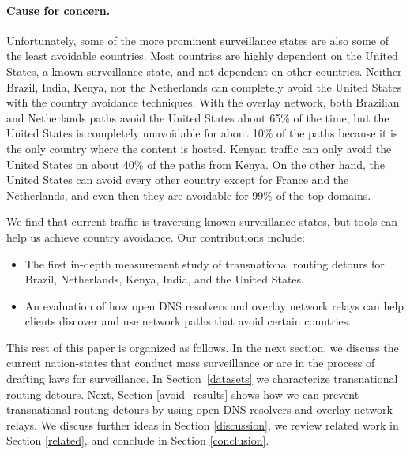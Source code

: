 \paragraph{Cause for concern.} Unfortunately, some of the more prominent surveillance states are also
some of the least avoidable countries.  Most countries are
highly dependent on the United States, a known surveillance state, and
not dependent on other countries.  Neither Brazil, India, Kenya, nor the
Netherlands can completely avoid the United States with the country
avoidance techniques.  With the overlay network, both Brazilian and
Netherlands paths avoid the United States about 65\% of the time, but
the United States is completely unavoidable for about 10\% of the paths
because it is the only country where the content is hosted.  Kenyan traffic can
only avoid the United States on about 40\% of the paths from Kenya.  On the other hand, the United States can avoid
every other country except for France and the Netherlands, and even then
they are avoidable for 99\% of the top domains. 

We find that current traffic is traversing known surveillance states, but tools can help us achieve country avoidance. Our contributions 
include: 

\begin{itemize}
\item The first in-depth measurement study of
  transnational routing detours for Brazil, Netherlands, Kenya, India, and the
  United States. 
\item An evaluation of how open DNS resolvers and overlay
  network relays can help clients discover and use
  network paths that avoid certain countries.
\end{itemize}
\noindent

This rest of this paper is organized as follows.  In the next section, we discuss
the current nation-states that conduct mass surveillance or are in the 
process of drafting laws for surveillance.  In
Section~\ref{datasets} we characterize transnational routing detours. Next, Section
\ref{avoid_results} shows how we can prevent transnational routing detours by using open DNS resolvers
and overlay network relays.  We discuss further ideas in Section
\ref{discussion}, we review related work in Section \ref{related}, and
conclude in Section \ref{conclusion}. 
